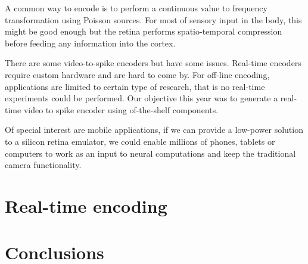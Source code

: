 A common way to encode is to perform a continuous value to frequency transformation using Poisson sources. For most of sensory input in the body, this might be good enough but the retina performs spatio-temporal compression before feeding any information into the cortex.

There are some video-to-spike encoders but have some issues. Real-time encoders require custom hardware and are hard to come by. For off-line encoding, applications are limited to certain type of research, that is no real-time experiments could be performed. Our objective this year was to generate a real-time video to spike encoder using of-the-shelf components. 

Of special interest are mobile applications, if we can provide a low-power solution to a silicon retina emulator, we could enable millions of phones, tablets or computers to work as an input to neural computations and keep the traditional camera functionality.

\section{Real-time encoding}

%

%
\section{Conclusions}
